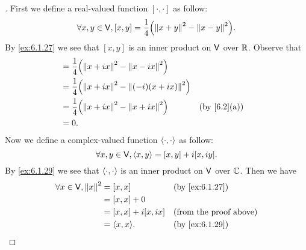 \begin{proof}[]
  First we define a real-valued function \([\cdot, \cdot]\) as follow:
  \[
    \forall x, y \in \V, [x, y] = \frac{1}{4} \pa{\norm{x + y}^2 - \norm{x - y}^2}.
  \]
  By \cref{ex:6.1.27} we see that \([x, y]\) is an inner product on \(\mathsf{V}\) over \(\mathbb{R}\).
  Observe that
  \begin{align*}
    [x, ix] & = \frac{1}{4} \pa{\norm{x + ix}^2 - \norm{x - ix}^2}                                       \\
            & = \frac{1}{4} \pa{\norm{x + ix}^2 - \norm{(-i) (x + ix)}^2}                                \\
            & = \frac{1}{4} \pa{\norm{x + ix}^2 - \norm{x + ix}^2}        &  & \text{(by \cref{6.2}(a))} \\
            & = 0.
  \end{align*}
  Now we define a complex-valued function \(\left\langle\cdot, \cdot\right\rangle\) as follow:
  \[
    \forall x, y \in \mathsf{V}, \left\langle x, y\right\rangle = [x, y] + i[x, iy].
  \]
  By \cref{ex:6.1.29} we see that \(\left\langle\cdot, \cdot\right\rangle\) is an inner product on \(\mathsf{V}\) over \(\mathbb{C}\).
  Then we have
  \begin{align*}
    \forall x \in \V, \norm{x}^2 & = [x, x]            &  & \text{(by \cref{ex:6.1.27})}  \\
                                 & = [x, x] + 0                                           \\
                                 & = [x, x] + i[x, ix] &  & \text{(from the proof above)} \\
                                 & = \inn{x, x}.       &  & \text{(by \cref{ex:6.1.29})}
  \end{align*}
\end{proof}

